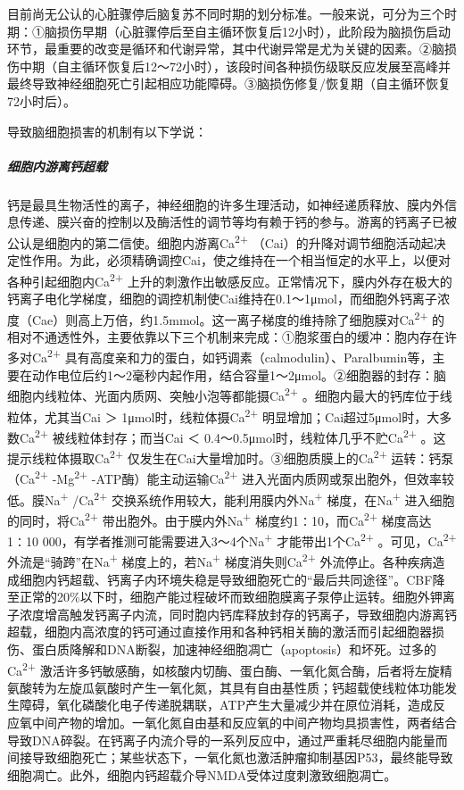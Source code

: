 目前尚无公认的心脏骤停后脑复苏不同时期的划分标准。一般来说，可分为三个时期：①脑损伤早期（心脏骤停后至自主循环恢复后12小时），此阶段为脑损伤启动环节，最重要的改变是循环和代谢异常，其中代谢异常是尤为关键的因素。②脑损伤中期（自主循环恢复后12～72小时），该段时间各种损伤级联反应发展至高峰并最终导致神经细胞死亡引起相应功能障碍。③脑损伤修复/恢复期（自主循环恢复72小时后）。

导致脑细胞损害的机制有以下学说：

\subparagraph{细胞内游离钙超载}

钙是最具生物活性的离子，神经细胞的许多生理活动，如神经递质释放、膜内外信息传递、膜兴奋的控制以及酶活性的调节等均有赖于钙的参与。游离的钙离子已被公认是细胞内的第二信使。细胞内游离Ca\textsuperscript{2+}
（Cai）的升降对调节细胞活动起决定性作用。为此，必须精确调控Cai，使之维持在一个相当恒定的水平上，以便对各种引起细胞内Ca\textsuperscript{2+}
上升的刺激作出敏感反应。正常情况下，膜内外存在极大的钙离子电化学梯度，细胞的调控机制使Cai维持在0.1～1μmol，而细胞外钙离子浓度（Cae）则高上万倍，约1.5mmol。这一离子梯度的维持除了细胞膜对Ca\textsuperscript{2+}
的相对不通透性外，主要依靠以下三个机制来完成：①胞浆蛋白的缓冲：胞内存在许多对Ca\textsuperscript{2+}
具有高度亲和力的蛋白，如钙调素（calmodulin）、Paralbumin等，主要在动作电位后约1～2毫秒内起作用，结合容量1～2μmol。②细胞器的封存：脑细胞内线粒体、光面内质网、突触小泡等都能摄Ca\textsuperscript{2+}
。细胞内最大的钙库位于线粒体，尤其当Cai ＞
1μmol时，线粒体摄Ca\textsuperscript{2+}
明显增加；Cai超过5μmol时，大多数Ca\textsuperscript{2+}
被线粒体封存；而当Cai ＜
0.4～0.5μmol时，线粒体几乎不贮Ca\textsuperscript{2+}
。这提示线粒体摄取Ca\textsuperscript{2+}
仅发生在Cai大量增加时。③细胞质膜上的Ca\textsuperscript{2+}
运转：钙泵（Ca\textsuperscript{2+} -Mg\textsuperscript{2+}
-ATP酶）能主动运输Ca\textsuperscript{2+}
进入光面内质网或泵出胞外，但效率较低。膜Na\textsuperscript{+}
/Ca\textsuperscript{2+}
交换系统作用较大，能利用膜内外Na\textsuperscript{+}
梯度，在Na\textsuperscript{+} 进入细胞的同时，将Ca\textsuperscript{2+}
带出胞外。由于膜内外Na\textsuperscript{+}
梯度约1∶10，而Ca\textsuperscript{2+} 梯度高达1∶10
000，有学者推测可能需要进入3～4个Na\textsuperscript{+}
才能带出1个Ca\textsuperscript{2+} 。可见，Ca\textsuperscript{2+}
外流是“骑跨”在Na\textsuperscript{+} 梯度上的，若Na\textsuperscript{+}
梯度消失则Ca\textsuperscript{2+}
外流停止。各种疾病造成细胞内钙超载、钙离子内环境失稳是导致细胞死亡的“最后共同途径”。CBF降至正常的20\%以下时，细胞产能过程破坏而致细胞膜离子泵停止运转。细胞外钾离子浓度增高触发钙离子内流，同时胞内钙库释放封存的钙离子，导致细胞内游离钙超载，细胞内高浓度的钙可通过直接作用和各种钙相关酶的激活而引起细胞器损伤、蛋白质降解和DNA断裂，加速神经细胞凋亡（apoptosis）和坏死。过多的Ca\textsuperscript{2+}
激活许多钙敏感酶，如核酸内切酶、蛋白酶、一氧化氮合酶，后者将左旋精氨酸转为左旋瓜氨酸时产生一氧化氮，其具有自由基性质；钙超载使线粒体功能发生障碍，氧化磷酸化电子传递脱耦联，ATP产生大量减少并在原位消耗，造成反应氧中间产物的增加。一氧化氮自由基和反应氧的中间产物均具损害性，两者结合导致DNA碎裂。在钙离子内流介导的一系列反应中，通过严重耗尽细胞内能量而间接导致细胞死亡；某些状态下，一氧化氮也激活肿瘤抑制基因P53，最终能导致细胞凋亡。此外，细胞内钙超载介导NMDA受体过度刺激致细胞凋亡。


